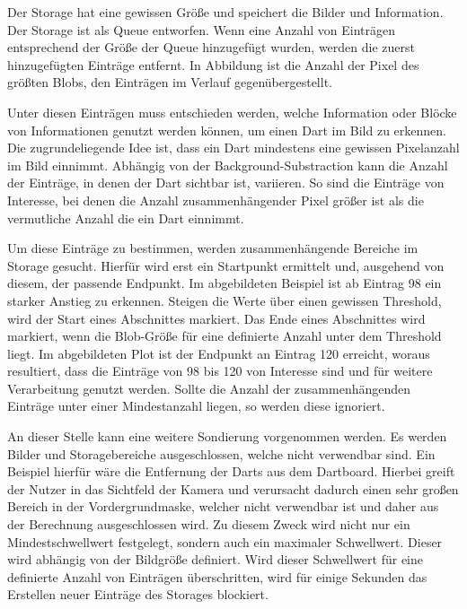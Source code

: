 Der Storage hat eine gewissen Größe und speichert die Bilder und Information. Der Storage ist als Queue entworfen. Wenn eine Anzahl von Einträgen entsprechend der Größe der Queue hinzugefügt wurden, werden die zuerst hinzugefügten Einträge entfernt. In Abbildung  ist die Anzahl der Pixel des größten Blobs, den Einträgen im Verlauf gegenübergestellt.

Unter diesen Einträgen muss entschieden werden, welche Information oder Blöcke von Informationen genutzt werden können, um einen Dart im Bild zu erkennen. Die zugrundeliegende Idee ist, dass ein Dart mindestens eine gewissen Pixelanzahl im Bild einnimmt. Abhängig von der Background-Substraction kann die Anzahl der Einträge, in denen der Dart sichtbar ist, variieren. So sind die Einträge von Interesse, bei denen die Anzahl zusammenhängender Pixel größer ist als die vermutliche Anzahl die ein Dart einnimmt.

Um diese Einträge zu bestimmen, werden zusammenhängende Bereiche im Storage gesucht. Hierfür wird erst ein Startpunkt ermittelt und, ausgehend von diesem, der passende Endpunkt.
Im abgebildeten Beispiel ist ab Eintrag 98 ein starker Anstieg zu erkennen. Steigen die Werte über einen gewissen Threshold, wird der Start eines Abschnittes markiert. Das Ende eines Abschnittes wird markiert, wenn die Blob-Größe für eine definierte Anzahl unter dem Threshold liegt. Im abgebildeten Plot ist der Endpunkt an Eintrag 120 erreicht, woraus resultiert, dass die Einträge von 98 bis 120 von Interesse sind und für weitere Verarbeitung genutzt werden. 
Sollte die Anzahl der zusammenhängenden Einträge unter einer Mindestanzahl liegen, so werden diese ignoriert.

An dieser Stelle kann eine weitere Sondierung vorgenommen werden. Es werden Bilder und Storagebereiche ausgeschlossen, welche nicht verwendbar sind.
Ein Beispiel hierfür wäre die Entfernung der Darts aus dem Dartboard. Hierbei greift der Nutzer in das Sichtfeld der Kamera und verursacht dadurch einen sehr großen Bereich in der Vordergrundmaske, welcher nicht verwendbar ist und daher aus der Berechnung ausgeschlossen wird. Zu diesem Zweck wird nicht nur ein Mindestschwellwert festgelegt, sondern auch ein maximaler Schwellwert. Dieser wird abhängig von der Bildgröße definiert. Wird dieser Schwellwert für eine definierte Anzahl von Einträgen überschritten, wird für einige Sekunden das Erstellen neuer Einträge des Storages blockiert.

